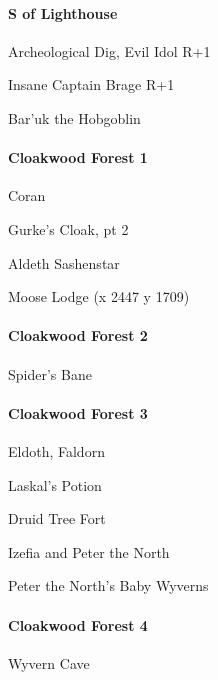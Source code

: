 \documentclass[10pt,a4,twoside]{book}
\begin{document}
\begin{multicols}{3}
\paragraph*{S of Lighthouse}
\begin{trivlist}
\item Archeological Dig, Evil Idol {\textcolor{OliveGreen}{R+1}}
\item Insane Captain Brage {\textcolor{OliveGreen}{R+1}}  \label{brage} %
\item Bar'uk the Hobgoblin
\end{trivlist}

\paragraph*{Cloakwood Forest 1}
\begin{trivlist}
\item Coran
\item Gurke's Cloak, pt 2  \label{gcloak} %
\item Aldeth Sashenstar
\item Moose Lodge (x 2447 y 1709)
\end{trivlist}

\paragraph*{Cloakwood Forest 2}
\begin{trivlist}
\item Spider's Bane
\end{trivlist}

\paragraph*{Cloakwood Forest 3}
\begin{trivlist}
\item Eldoth, Faldorn
\item Laskal's Potion
\item Druid Tree Fort
\item Izefia and Peter the North
\item Peter the North's Baby Wyverns
\end{trivlist}

\paragraph*{Cloakwood Forest 4}
\begin{trivlist}
\item Wyvern Cave
\end{trivlist}


\end{multicols}
\end{document}
